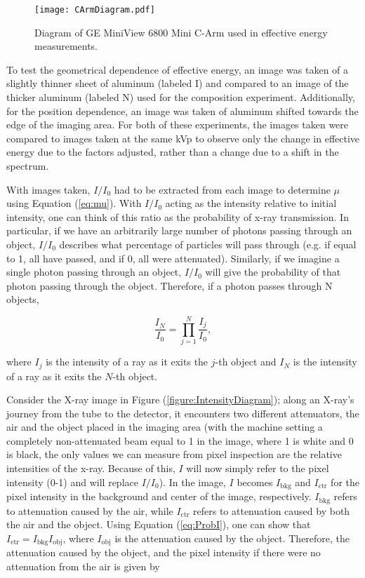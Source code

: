 \begin{figure}[H]
    \centering
	\texttt{[image: CArmDiagram.pdf]}
	\caption{Diagram of GE MiniView 6800 Mini C-Arm used in effective energy measurements.}
	\label{figure:CArmDiagram}
\end{figure}

To test the geometrical dependence of effective energy, an image was taken of a slightly thinner sheet of aluminum (labeled I) and compared to an image of the thicker aluminum (labeled N) used for the composition experiment. Additionally, for the position dependence, an image was taken of aluminum shifted towards the edge of the imaging area. For both of these experiments, the images taken were compared to images taken at the same kVp to observe only the change in effective energy due to the factors adjusted, rather than a change due to a shift in the spectrum.

With images taken, $I/I_0$ had to be extracted from each image to determine $\mu$ using Equation (\ref{eq:mu}). With $I/I_0$ acting as the intensity relative to initial intensity, one can think of this ratio as the probability of x-ray transmission. In particular, if we have an arbitrarily large number of photons passing through an object, $I/I_0$ describes what percentage of particles will pass through (e.g. if equal to 1, all have passed, and if 0, all were attenuated). Similarly, if we imagine a single photon passing through an object, $I/I_0$ will give the probability of that photon passing through the object. Therefore, if a photon passes through N objects, 

\begin{equation}
    \frac{I_N}{I_0} = \prod_{j=1}^{N} \frac{I_j}{I_0},
   \label{eq:ProbI}
\end{equation}

where $I_j$ is the intensity of a ray as it exits the $j$-th object and $I_N$ is the intensity of a ray as it exits the $N$-th object.

Consider the X-ray image in Figure (\ref{figure:IntensityDiagram}); along an X-ray's journey from the tube to the detector, it encounters two different attenuators, the air and the object placed in the imaging area (with the machine setting a completely non-attenuated beam equal to 1 in the image, where 1 is white and 0 is black, the only values we can measure from pixel inspection are the relative intensities of the x-ray. Because of this, $I$ will now simply refer to the pixel intensity (0-1) and will replace $I/I_0$). In the image, $I$ becomes $I_{\text{bkg}}$ and $I_{\text{ctr}}$ for the pixel intensity in the background and center of the image, respectively. $I_{\text{bkg}}$ refers to attenuation caused by the air, while $I_{\text{ctr}}$ refers to attenuation caused by both the air and the object. Using Equation (\ref{eq:ProbI}), one can show that $I_{\text{ctr}} = I_{\text{bkg}} I_{\text{obj}}$, where $I_{\text{obj}}$ is the attenuation caused by the object. Therefore, the attenuation caused by the object, and the pixel intensity if there were no attenuation from the air is given by

